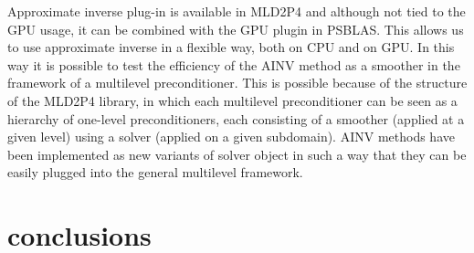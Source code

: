 \documentclass[conference]{IEEEtran}
\begin{document}
Approximate inverse plug-in is available in MLD2P4 and although not tied to the GPU usage, it can be combined with the GPU plugin in PSBLAS. This allows us to use approximate inverse in a flexible way, both on CPU and on GPU. In this way it is possible to test the efficiency of the AINV method as a smoother in the framework of a multilevel preconditioner. This is possible because of the structure of the MLD2P4 library, in which each multilevel preconditioner can be seen as a hierarchy of one-level preconditioners, each consisting of a smoother (applied at a given level) using a solver (applied on a given subdomain). AINV methods have been implemented as new variants of solver object in such a way that they can be easily plugged into the general multilevel framework. 



\section{conclusions}




\end{document}
